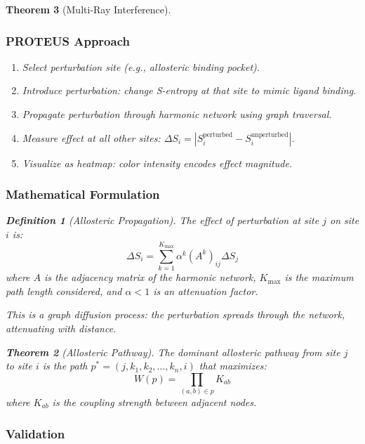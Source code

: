 \documentclass[11pt,a4paper]{article}
\newtheorem{theorem}{Theorem}[section]
\newtheorem{definition}[theorem]{Definition}
\begin{document}
\begin{theorem}[Multi-Ray Interference]
\subsubsection{PROTEUS Approach}

\begin{enumerate}
\item Select perturbation site (e.g., allosteric binding pocket).
\item Introduce perturbation: change S-entropy at that site to mimic ligand binding.
\item Propagate perturbation through harmonic network using graph traversal.
\item Measure effect at all other sites: $\Delta S_i = |S_i^{\text{perturbed}} - S_i^{\text{unperturbed}}|$.
\item Visualize as heatmap: color intensity encodes effect magnitude.
\end{enumerate}

\subsubsection{Mathematical Formulation}

\begin{definition}[Allosteric Propagation]
The effect of perturbation at site $j$ on site $i$ is:
\begin{equation}
\Delta S_i = \sum_{k=1}^{K_{\max}} \alpha^k (A^k)_{ij} \Delta S_j
\end{equation}
where $A$ is the adjacency matrix of the harmonic network, $K_{\max}$ is the maximum path length considered, and $\alpha < 1$ is an attenuation factor.
\end{definition}

This is a graph diffusion process: the perturbation spreads through the network, attenuating with distance.

\begin{theorem}[Allosteric Pathway]
The dominant allosteric pathway from site $j$ to site $i$ is the path $p^* = (j, k_1, k_2, \ldots, k_n, i)$ that maximizes:
\begin{equation}
W(p) = \prod_{(a,b) \in p} K_{ab}
\end{equation}
where $K_{ab}$ is the coupling strength between adjacent nodes.
\end{theorem}

\subsubsection{Validation}


\end{theorem}
\end{document}
